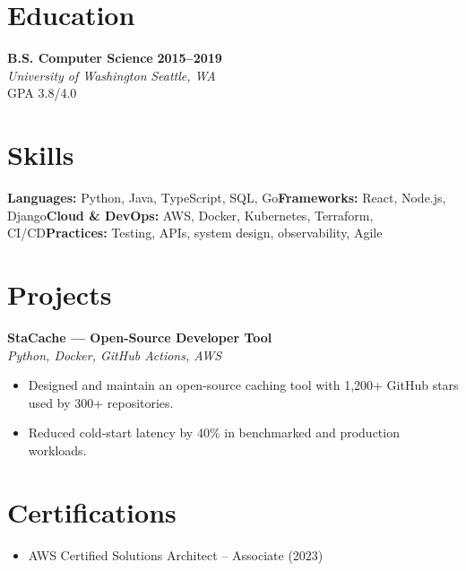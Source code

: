 \documentclass[10pt,letterpaper]{article}
\begin{document}
\section{Education}
\noindent\textbf{B.S. Computer Science} \hfill \textbf{2015--2019}\\
\textit{University of Washington} \hfill \textit{Seattle, WA}\\[2pt]
{\small GPA 3.8/4.0}

\section{Skills}
\noindent \textbf{Languages:} Python, Java, TypeScript, SQL, Go\newline \textbf{Frameworks:} React, Node.js, Django\newline \textbf{Cloud \& DevOps:} AWS, Docker, Kubernetes, Terraform, CI/CD\newline \textbf{Practices:} Testing, APIs, system design, observability, Agile

\section{Projects}
\noindent\textbf{StaCache --- Open-Source Developer Tool}\\[1pt]
{\small\textit{Python, Docker, GitHub Actions, AWS}}
\begin{itemize}
\item Designed and maintain an open-source caching tool with 1,200+ GitHub stars used by 300+ repositories.
\item Reduced cold-start latency by 40\% in benchmarked and production workloads.
\end{itemize}
\vspace{5pt}
\section{Certifications}
\begin{itemize}
\item AWS Certified Solutions Architect -- Associate (2023)
\end{itemize}
\end{document}
